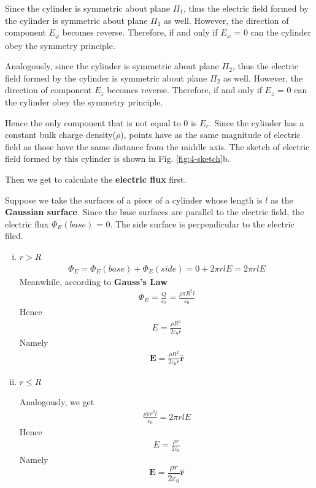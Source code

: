 \documentclass[12pt,a4paper]{article}
\begin{document}
Since the cylinder is symmetric about plane $\Pi_1$, thus the electric field formed by the cylinder is symmetric about plane $\Pi_1$ as well. However, the direction of component $E_\varphi$ becomes reverse. Therefore, if and only if $E_\varphi$ = 0 can the cylinder obey the symmetry principle.

Analogously, since the cylinder is symmetric about plane $\Pi_2$, thus the electric field formed by the cylinder is symmetric about plane $\Pi_2$ as well. However, the direction of component $E_z$ becomes reverse. Therefore, if and only if $E_z$ = 0 can the cylinder obey the symmetry principle.

Hence the only component that is not equal to 0 is $E_r$. Since the cylinder has a constant bulk charge density($\rho$), points have as the same magnitude of electric field as those have the same distance from the middle axis. The sketch of electric field formed by this cylinder is shown in Fig. \ref{fig:4-sketch}b.

Then we get to calculate the \textbf{electric flux} first.

Suppose we take the surfaces of a piece of a cylinder whose length is $l$ as the \textbf{Gaussian surface}.
Since the base surfaces are parallel to the electric field, the electric flux $\Phi_E(base)$ = 0. The side surface is perpendicular to the electric filed.

\begin{enumerate}[(i)]
\item $r > R$
\begin{align}
    \Phi_E = \Phi_E(base) + \Phi_E(side) = 0 + 2\pi r l E = 2\pi r l E
\end{align}
Meanwhile, according to \textbf{Gauss's Law}
\begin{align}
    \Phi_E = \frac{Q}{\varepsilon_0} = \frac{\rho \pi R^2 l}{\varepsilon_0}
\end{align}
Hence
\begin{align}
    E = \frac{\rho R^2}{2\varepsilon_0 r}
\end{align}
Namely
\begin{align}
    \textbf{E} = \frac{\rho R^2}{2\varepsilon_0 r} \hat{\textbf{r}}
\end{align}

\item $r \leq R$

Analogously, we get
\begin{align}
    \frac{\rho \pi r^2 l}{\varepsilon_0} = 2\pi r l E
\end{align}
Hence
\begin{align}
    E = \frac{\rho r}{2\varepsilon_0}
\end{align}
Namely
\begin{equation}
    \textbf{E} = \frac{\rho r}{2\varepsilon_0} \hat{\textbf{r}}
    \label{4-eq}
\end{equation}
\end{enumerate}
\end{document}
